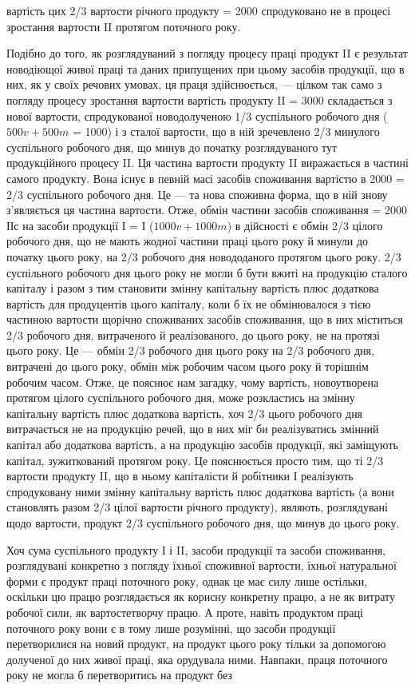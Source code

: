 \parcont{}  %
вартість цих 2/3 вартости річного продукту = 2000 спродуковано не
в процесі зростання вартости II протягом поточного року.

Подібно до того, як розглядуваний з погляду процесу праці продукт
II є результат новодіющої живої праці та даних припущених при цьому
засобів продукції, що в них, як у своїх речових умовах, ця праця здійснюється,
— цілком так само з погляду процесу зростання вартости вартість
продукту II = 3000 складається з нової вартости, спродукованої новодолученою
1/3 суспільного робочого дня ($500 v + 500m$ = 1000) і з сталої
вартости, що в ній зречевлено 2/3 минулого суспільного робочого дня,
що минув до початку розглядуваного тут продукційного процесу II. Ця
частина вартости продукту II виражається в частині самого продукту.
Вона існує в певній масі засобів споживання вартістю в 2000 = 2/3 суспільного
робочого дня. Це — та нова споживна форма, що в ній знову
з’являється ця частина вартости. Отже, обмін частини засобів споживання =
2000 ІІс на засоби продукції І = І ($1000 v + 1000 m$) в дійсності є обмін
2/3 цілого робочого дня, що не мають жодної частини праці цього року
й минули до початку цього року, на 2/3 робочого дня новододаного протягом
цього року. 2/3 суспільного робочого дня цього року не могли б
бути вжиті на продукцію сталого капіталу і разом з тим становити змінну
капітальну вартість плюс додаткова вартість для продуцентів цього капіталу,
коли б їх не обмінювалося з тією частиною вартости щорічно
споживаних засобів споживання, що в них міститься 2/3 робочого дня,
витраченого й реалізованого, до цього року, не на протязі цього
року. Це — обмін 2/3 робочого дня цього року на 2/3 робочого дня,
витрачені до цього року, обмін між робочим часом цього року й
торішнім робочим часом. Отже, це пояснює нам загадку, чому вартість,
новоутворена протягом цілого суспільного робочого дня, може розкластись
на змінну капітальну вартість плюс додаткова вартість, хоч
2/3 цього робочого дня витрачається не на продукцію речей, що в
них міг би реалізуватись змінний капітал або додаткова вартість, а
на продукцію засобів продукції, які заміщують капітал, зужиткований
протягом року. Це пояснюється просто тим, що ті 2/3 вартости продукту
II, що в ньому капіталісти й робітники І реалізують спродуковану
ними змінну капітальну вартість плюс додаткова вартість (а вони
становлять разом 2/3 цілої вартости річного продукту), являють, розглядувані
щодо вартости, продукт 2/3 суспільного робочого дня, що
минув до цього року.

Хоч сума суспільного продукту І і II, засоби продукції та засоби
споживання, розглядувані конкретно з погляду їхньої споживної вартости,
їхньої натуральної форми є продукт праці поточного року, однак це має
силу лише остільки, оскільки цю працю розглядається як корисну конкретну
працю, а не як витрату робочої сили, як вартостетворчу працю.
А проте, навіть продуктом праці поточного року вони є в тому лише розумінні,
що засоби продукції перетворилися на новий продукт, на продукт
цього року тільки за допомогою долученої до них живої праці, яка орудувала
ними. Навпаки, праця поточного року не могла б перетворитись на продукт без
\parbreak{}  %
